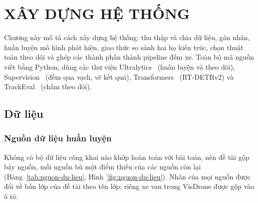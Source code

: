\chapter{XÂY DỰNG HỆ THỐNG}
\label{chap:xaydung}

Chương này mô tả cách xây dựng hệ thống: thu thập và chia dữ liệu, gán nhãn, huấn luyện mô hình phát hiện, giao thức
so sánh hai họ kiến trúc, chọn thuật toán theo dõi và ghép các thành phần thành pipeline đếm xe. Toàn bộ mã nguồn viết
bằng Python, dùng các thư viện Ultralytics~\cite{ultralytics} (huấn luyện và theo dõi), Supervision~\cite{supervision}
(đếm qua vạch, vẽ kết quả), Transformers~\cite{transformers} (RT-DETRv2) và TrackEval~\cite{trackeval} (chấm theo dõi).

\section{Dữ liệu}

\subsection{Nguồn dữ liệu huấn luyện}

Không có bộ dữ liệu công khai nào khớp hoàn toàn với bài toán, nên đề tài gộp bảy nguồn, mỗi nguồn bù một điểm thiếu
của các nguồn còn lại (Bảng~\ref{tab:nguon-du-lieu}, Hình~\ref{fig:nguon-du-lieu}). Nhãn của mọi nguồn được đổi về
bốn lớp của đề tài theo tên lớp; riêng xe van trong VisDrone được gộp vào ô tô.

